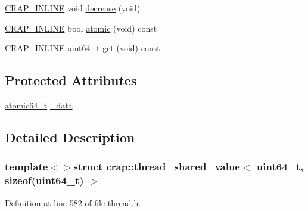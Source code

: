 \begin{DoxyCompactItemize}
\hyperlink{config__x86_8h_a5a40526b8d842e7ff731509998bb0f1c}{C\+R\+A\+P\+\_\+\+I\+N\+L\+I\+N\+E} void \hyperlink{structcrap_1_1thread__shared__value_3_01uint64__t_00_01sizeof_07uint64__t_08_01_4_a6b12f4355c0e6e4cba1e1d749738d66a}{decrease} (void)
\item 
\hyperlink{config__x86_8h_a5a40526b8d842e7ff731509998bb0f1c}{C\+R\+A\+P\+\_\+\+I\+N\+L\+I\+N\+E} bool \hyperlink{structcrap_1_1thread__shared__value_3_01uint64__t_00_01sizeof_07uint64__t_08_01_4_a2904fd52f1a1098b34097edc2a009f78}{atomic} (void) const 
\item 
\hyperlink{config__x86_8h_a5a40526b8d842e7ff731509998bb0f1c}{C\+R\+A\+P\+\_\+\+I\+N\+L\+I\+N\+E} uint64\+\_\+t \hyperlink{structcrap_1_1thread__shared__value_3_01uint64__t_00_01sizeof_07uint64__t_08_01_4_a32f8a0ea1395aac402cc38a0981a34f7}{get} (void) const 
\end{DoxyCompactItemize}
\subsection*{Protected Attributes}
\begin{DoxyCompactItemize}
\item 
\hyperlink{structcrap_1_1atomic64__t}{atomic64\+\_\+t} \hyperlink{structcrap_1_1thread__shared__value_3_01uint64__t_00_01sizeof_07uint64__t_08_01_4_a65a7bf091f0c099fe3f14adbbf59b0e6}{\+\_\+data}
\end{DoxyCompactItemize}


\subsection{Detailed Description}
\subsubsection*{template$<$$>$struct crap\+::thread\+\_\+shared\+\_\+value$<$ uint64\+\_\+t, sizeof(uint64\+\_\+t) $>$}



Definition at line 582 of file thread.\+h.



